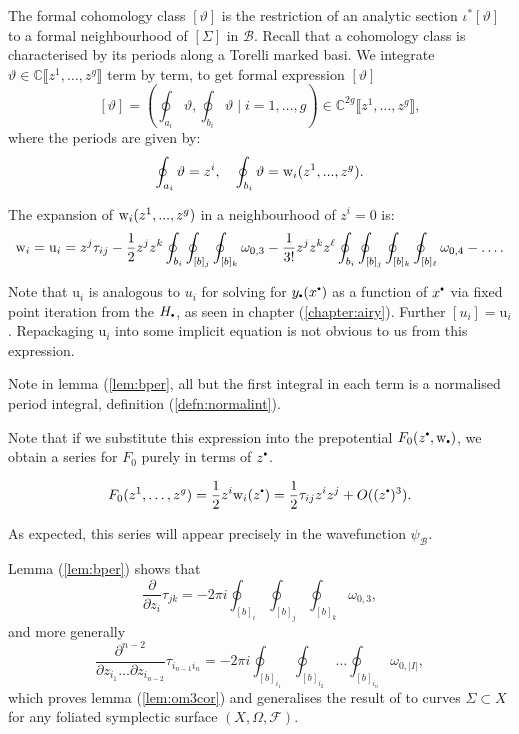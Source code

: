     The formal cohomology class \([\vartheta]\) is the restriction of an analytic section \( \iota^* [ \vartheta]\) to a formal neighbourhood of \([\Sigma] \) in \( \mathcal{B}\). Recall that a cohomology class is characterised by its periods along a Torelli marked basi. We integrate \( \vartheta \in \mathbb{C}\lBrack z^1, \dots, z^g \rBrack \) term by term, to get formal expression \([\vartheta]\)
    \[[\vartheta]= \left( \oint_{a_i}\vartheta, \oint_{b_i}\vartheta \mid i=1,\dots,g\right) \in \mathbb{C}^{2g}\lBrack z^1, \dots, z^g \rBrack,\]
    where the periods are given by:
    \[\oint_{a_i}\vartheta=z^i,\quad\oint_{b_i}\vartheta= \mathrm{w}_i(z^1,...,z^g). \]
    \begin{lem}  
        \label{lem:bper}
        The expansion of \(\mathrm{w}_i(z^1,...,z^g)\) in a neighbourhood of \(z^i=0\) is:
        \begin{equation}   \label{bperi}   
            \mathrm{w}_i = \mathrm{u}_i = z^j\tau_{ij}-\frac12z^jz^k\oint_{b_i}\oint_{[b]_j}\oint_{[b]_k}\omega_{0,3}-\frac{1}{3!}z^jz^kz^\ell\oint_{b_i}\oint_{[b]_j}\oint_{[b]_k}\oint_{[b]_\ell}\omega_{0,4}-\dots .
        \end{equation}
    \end{lem}
    \begin{rem} Note that \( \mathrm{u}_i \) is analogous to \( u_i\) for solving for \(y_{\sbt}(x^{\sbt})\) as a function of \(x^{\sbt}\) via fixed point iteration from the \(H_{\sbt}\), as seen in chapter (\ref{chapter:airy}). Further \( [u_i] = \mathrm{u}_i\). Repackaging \( \mathrm{u}_i\) into some implicit equation is not obvious to us from this expression. 
    \end{rem}
    Note in lemma (\ref{lem:bper}, all but the first integral in each term is a normalised period integral, definition (\ref{defn:normalint}).
    
    Note that if we substitute this expression into the prepotential \( 
    F_0(z^{\sbt},\w_{\sbt})\), we obtain a series for \(F_0\) purely in terms of \(z^{\sbt}\).
    \begin{lem}
    \begin{equation} 
    \label{eqn:prepotential}
     F_0(z^1, \dots, z^g) = \frac{1}{2} z^i \w_i(z^{\sbt})= \frac{1}{2} \tau_{ij} z^i z^j + O((z^{\sbt})^3).
    \end{equation}
    \end{lem}
    As expected, this series will appear precisely in the wavefunction \( \psi_{\mathcal{B}}\).
    
    
    Lemma (\ref{lem:bper}) shows that
    \[\frac{\partial}{\partial z_i}\tau_{jk}=-2\pi i\oint_{[b]_i}\oint_{[b]_j}\oint_{[b]_k}\omega_{0,3},\]
    and more generally 
    \[\frac{\partial^{n-2}}{\partial z_{i_1} \dots \partial z_{i_{n-2}}}\tau_{i_{n-1}i_n}=-2\pi i\oint_{[b]_{i_1}}\oint_{[b]_{i_2}} \dots \oint_{[b]_{i_n}}\omega_{0,|I|},\] 
    which proves lemma (\ref{lem:om3cor}) and generalises the result of \cite{bhuespe} to curves \(\Sigma\subset X \) for any foliated symplectic surface \((X,\Omega,\mathcal{F})\).
    
